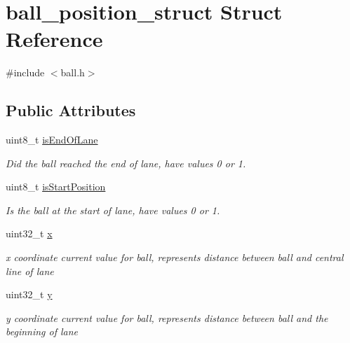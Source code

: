 \hypertarget{structball__position__struct}{\section{ball\-\_\-position\-\_\-struct Struct Reference}
\label{structball__position__struct}
}


{\ttfamily \#include $<$ball.\-h$>$}

\subsection*{Public Attributes}
\begin{DoxyCompactItemize}
\item 
\hypertarget{structball__position__struct_a8f47b48ceabe4b51bc570e9961dff7d2}{uint8\-\_\-t \hyperlink{structball__position__struct_a8f47b48ceabe4b51bc570e9961dff7d2}{is\-End\-Of\-Lane}}\label{structball__position__struct_a8f47b48ceabe4b51bc570e9961dff7d2}

\begin{DoxyCompactList}\small\item\em Did the ball reached the end of lane, have values 0 or 1. \end{DoxyCompactList}\item 
\hypertarget{structball__position__struct_a31b3f2d42d6caf253e00824e2d65adea}{uint8\-\_\-t \hyperlink{structball__position__struct_a31b3f2d42d6caf253e00824e2d65adea}{is\-Start\-Position}}\label{structball__position__struct_a31b3f2d42d6caf253e00824e2d65adea}

\begin{DoxyCompactList}\small\item\em Is the ball at the start of lane, have values 0 or 1. \end{DoxyCompactList}\item 
\hypertarget{structball__position__struct_a8846c273d674d23c73b25d1b84e0dbe3}{uint32\-\_\-t \hyperlink{structball__position__struct_a8846c273d674d23c73b25d1b84e0dbe3}{x}}\label{structball__position__struct_a8846c273d674d23c73b25d1b84e0dbe3}

\begin{DoxyCompactList}\small\item\em x coordinate current value for ball, represents distance between ball and central line of lane \end{DoxyCompactList}\item 
\hypertarget{structball__position__struct_ae6604ac07d8bfee1d2ae9ff6a0644d28}{uint32\-\_\-t \hyperlink{structball__position__struct_ae6604ac07d8bfee1d2ae9ff6a0644d28}{y}}\label{structball__position__struct_ae6604ac07d8bfee1d2ae9ff6a0644d28}

\begin{DoxyCompactList}\small\item\em y coordinate current value for ball, represents distance between ball and the beginning of lane \end{DoxyCompactList}\end{DoxyCompactItemize}


